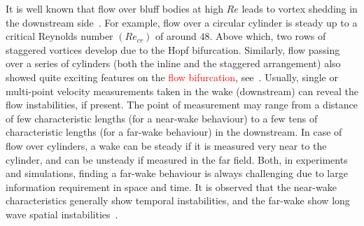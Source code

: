 \documentclass[aps,pre,twocolumn,aps,longbibliography]{revtex4-1}
\begin{document}
	It is well known that flow over bluff bodies at high $Re$ leads to vortex shedding in the downstream side~\cite{Sreenivasan1987}. For example, flow over a circular cylinder is steady up to a critical Reynolds number $(Re_{cr})$ of around $48$. Above which, two rows of staggered vortices develop due to the Hopf bifurcation. Similarly, flow passing over a series of cylinders (both the inline and the staggered arrangement) also showed quite exciting features on the \textcolor{red}{flow bifurcation}, see~\cite{Williamson1996, Shelley2011, LeeYou2013, Thompson2014}. Usually, single or multi-point velocity measurements taken in the wake (downstream) can reveal the flow instabilities, if present. The point of measurement may range from a distance of few characteristic lengths (for a near-wake behaviour) to a few tens of characteristic lengths (for a far-wake behaviour) in the downstream. In case of flow over cylinders, a wake can be steady if it is measured very near to the cylinder, and can be unsteady if measured in the far field. Both, in experiments and simulations, finding a far-wake behaviour is always challenging due to large information requirement in space and time. It is observed that the near-wake characteristics generally show temporal instabilities, and the far-wake show long wave spatial instabilities~\cite{Saha2003}.
	
\end{document}
